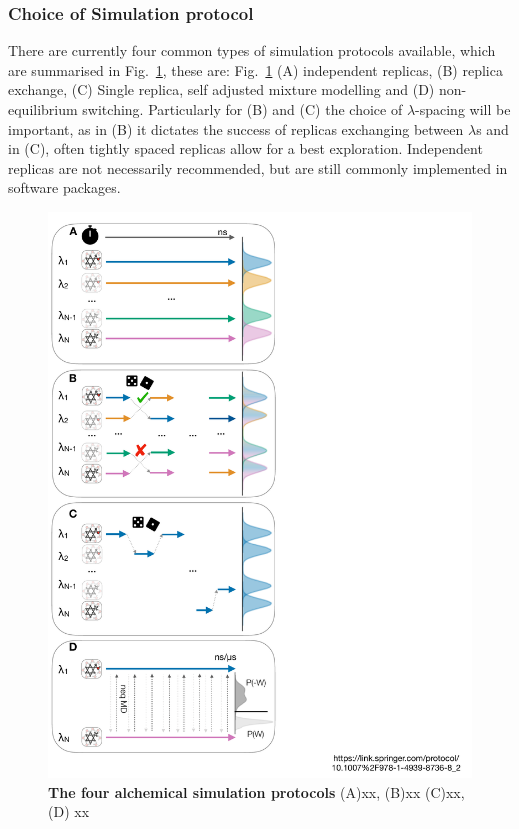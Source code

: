 \documentclass[9pt,bestpractices]{livecoms}
\begin{document}
\subsubsection{Choice of Simulation protocol}
There are currently four common types of simulation protocols available, which are summarised in Fig.~\ref{fig:protocols}, these are: Fig.~\ref{fig:protocols} (A) independent replicas, (B) replica exchange, (C) Single replica, self adjusted mixture modelling and (D) non-equilibrium switching. Particularly for (B) and (C) the choice of $\lambda$-spacing will be important, as in (B) it dictates the success of replicas exchanging between $\lambda$s and in (C), often tightly spaced replicas allow for a best exploration. Independent replicas are not necessarily recommended, but are still commonly implemented in software packages. 
\begin{figure}
    \includegraphics[width=0.95\linewidth]{figures/protocol.pdf}
    \caption{\textbf{The four alchemical simulation protocols} (A)xx, (B)xx (C)xx, (D) xx}
    \label{fig:protocols}
\end{figure}
\end{document}
